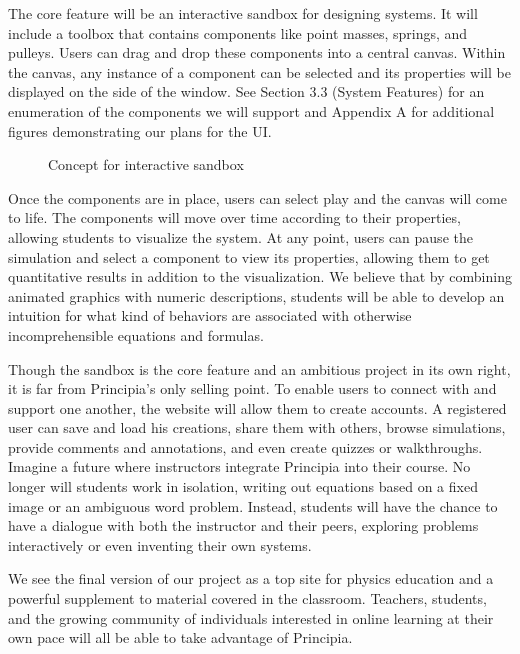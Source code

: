 The core feature will be an interactive sandbox for designing systems. It will include a toolbox that contains components like point masses, springs, and pulleys. Users can drag and drop these components into a central canvas. Within the canvas, any instance of a component can be selected and its properties will be displayed on the side of the window. See Section 3.3 (System Features) for an enumeration of the components we will support and Appendix A for additional figures demonstrating our plans for the UI. 

\begin{figure}[H]
	\centering
    \caption{Concept for interactive sandbox}
\end{figure}

\clearpage
\BgThispage
Once the components are in place, users can select play and the canvas will come to life. The components will move over time according to their properties, allowing students to visualize the system. At any point, users can pause the simulation and select a component to view its properties, allowing them to get quantitative results in addition to the visualization. We believe that by combining animated graphics with numeric descriptions, students will be able to develop an intuition for what kind of behaviors are associated with otherwise incomprehensible equations and formulas.

Though the sandbox is the core feature and an ambitious project in its own right, it is far from Principia's only selling point. To enable users to connect with and support one another, the website will allow them to create accounts. A registered user can save and load his creations, share them with others, browse simulations, provide comments and annotations, and even create quizzes or walkthroughs. Imagine a future where instructors integrate Principia into their course. No longer will students work in isolation, writing out equations based on a fixed image or an ambiguous word problem. Instead, students will have the chance to have a dialogue with both the instructor and their peers, exploring problems interactively or even inventing their own systems.

We see the final version of our project as a top site for physics education and a powerful supplement to material covered in the classroom. Teachers, students, and the growing community of individuals interested in online learning at their own pace will all be able to take advantage of Principia.